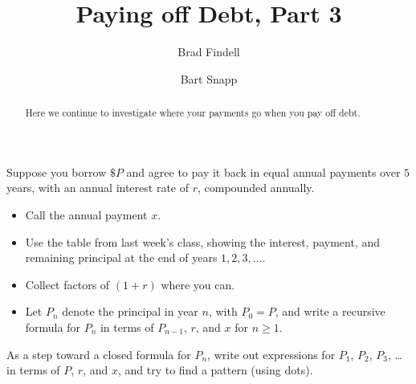 \documentclass[handout,space,nooutcomes]{ximera}
\title{Paying off Debt, Part 3}
\author{Brad Findell \and Bart Snapp}
\begin{document}
\begin{abstract}
Here we continue to investigate where your payments go when you pay off debt.
\end{abstract}
\maketitle

\begin{question}[1in]
Suppose you borrow $\$P$ and agree to pay it back in equal annual
payments over $5$ years, with an annual interest rate of $r$, compounded annually.  

\begin{itemize}
\item Call the annual payment $x$.
\item Use the table from last week's class, showing the interest, payment, and remaining
principal at the end of years $1, 2, 3, \dots$.  
\item Collect factors of $(1+r)$ where you can.  
\item Let $P_n$ denote the principal in year $n$, with $P_0=P$, and write a recursive formula for $P_n$ in terms of $P_{n-1}$, $r$, and $x$ for $n\ge 1$.  
\end{itemize}




%
\end{question}
\newpage
\begin{question}
As a step toward a closed formula for $P_n$, write out expressions for $P_1$, $P_2$, $P_3$, \dots in terms of $P$, $r$, and $x$, and try to find a pattern (using dots).  
\begin{freeResponse}
\end{freeResponse}
\vfill
\end{question}
\end{document}

